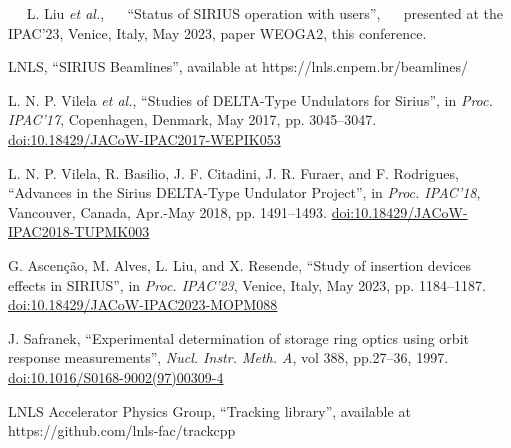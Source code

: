 \documentclass[a4paper,
               keeplastbox,   %
               ]{jacow}
\begin{document}
	\begin{thebibliography}{14} %

   L. Liu \emph{et al.},
   \textquotedblleft{Status of SIRIUS operation with users}\textquotedblright,
   presented at the IPAC’23, Venice, Italy, May 2023, paper WEOGA2, this conference.   
    


        LNLS,
        \textquotedblleft{SIRIUS Beamlines}\textquotedblright,
        available at https://lnls.cnpem.br/beamlines/

        L. N. P. Vilela \emph{et al.},
        \textquotedblleft{Studies of DELTA-Type Undulators for Sirius}\textquotedblright,
        in \emph{Proc. IPAC’17}, Copenhagen, Denmark, May 2017, pp. 3045--3047.
        \url{doi:10.18429/JACoW-IPAC2017-WEPIK053} 
    
   L. N. P. Vilela, R. Basilio, J. F. Citadini, J. R. Furaer, and F. Rodrigues,
   \textquotedblleft{Advances in the Sirius DELTA-Type Undulator Project}\textquotedblright,
   in \emph{Proc. IPAC’18}, Vancouver, Canada, Apr.-May 2018, pp. 1491--1493.
   \url{doi:10.18429/JACoW-IPAC2018-TUPMK003}  

   G. Ascenção, M. Alves, L. Liu, and X. Resende,
   \textquotedblleft{Study of insertion devices effects in SIRIUS}\textquotedblright,
   in \emph{Proc. IPAC’23}, Venice, Italy, May 2023, pp. 1184--1187.
   \url{doi:10.18429/JACoW-IPAC2023-MOPM088}    

	 J. Safranek,
		\textquotedblleft{Experimental determination of storage ring optics using orbit response measurements}\textquotedblright,
		\emph{Nucl.  Instr. Meth. A}, vol 388, pp.27--36, 1997.
        \url{doi:10.1016/S0168-9002(97)00309-4}

        LNLS Accelerator Physics Group,
        \textquotedblleft{Tracking library}\textquotedblright,
        available at https://github.com/lnls-fac/trackcpp
        



\end{thebibliography}
\end{document}
